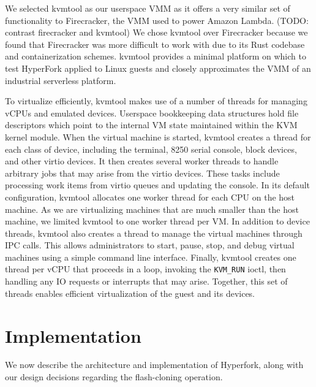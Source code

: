 We selected kvmtool as our userspace VMM as it offers a very similar set of
functionality to Firecracker, the VMM used to power Amazon Lambda. (TODO:
contrast firecracker and kvmtool) We chose kvmtool over Firecracker because we
found that Firecracker was more difficult to work with due to its Rust codebase
and containerization schemes. kvmtool provides a minimal platform on which to
test HyperFork applied to Linux guests and closely approximates the VMM of an
industrial serverless platform.

To virtualize efficiently, kvmtool makes use of a number of threads for
managing vCPUs and emulated devices. Userspace bookkeeping data structures hold
file descriptors which point to the internal VM state maintained within the KVM
kernel module. When the virtual machine is started, kvmtool creates a thread
for each class of device, including the terminal, 8250 serial console, block
devices, and other virtio devices. It then creates several worker threads to
handle arbitrary jobs that may arise from the virtio devices. These tasks
include processing work items from virtio queues and updating the console. In
its default configuration, kvmtool allocates one worker thread for each CPU on
the host machine. As we are virtualizing machines that are much smaller than
the host machine, we limited kvmtool to one worker thread per VM. In addition
to device threads, kvmtool also creates a thread to manage the virtual machines
through IPC calls. This allows administrators to start, pause, stop, and debug
virtual machines using a simple command line interface. Finally, kvmtool
creates one thread per vCPU that proceeds in a loop, invoking the
\texttt{KVM\_RUN} ioctl, then handling any IO requests or interrupts that may
arise. Together, this set of threads enables efficient virtualization of the
guest and its devices.

\section{Implementation}

We now describe the architecture and implementation of Hyperfork, along with
our design decisions regarding the flash-cloning operation.


